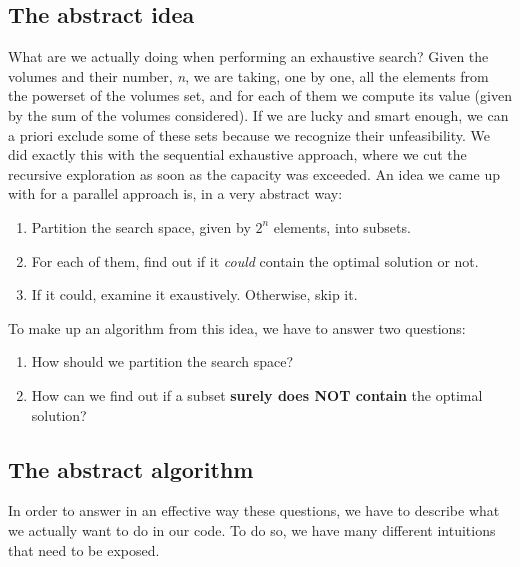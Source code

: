 \documentclass[12pt]{extarticle}
\begin{document}
\subsection{The abstract idea}
What are we actually doing when performing an exhaustive search? Given the volumes and their number, \emph{n}, we are taking, one by one, all the elements from the powerset of the volumes set, and for each of them we compute its value (given by the sum of the volumes considered). If we are lucky and smart enough, we can a priori exclude some of these sets because we recognize their unfeasibility. We did exactly this with the sequential exhaustive approach, where we cut the recursive exploration as soon as the capacity was exceeded.\newline
An idea we came up with for a parallel approach is, in a very abstract way:
\begin{enumerate}
    \item Partition the search space, given by $2^{n}$ elements, into subsets.
    \item For each of them, find out if it \emph{could} contain the optimal solution or not.
    \item If it could, examine it exaustively. Otherwise, skip it.
\end{enumerate}
To make up an algorithm from this idea, we have to answer two questions:
\begin{enumerate}
    \item How should we partition the search space?
    \item How can we find out if a subset \textbf{surely does NOT contain} the optimal solution?
\end{enumerate}
\subsection{The abstract algorithm}
In order to answer in an effective way these questions, we have to describe what we actually want to do in our code. To do so, we have many different intuitions that need to be exposed.
\end{document}
